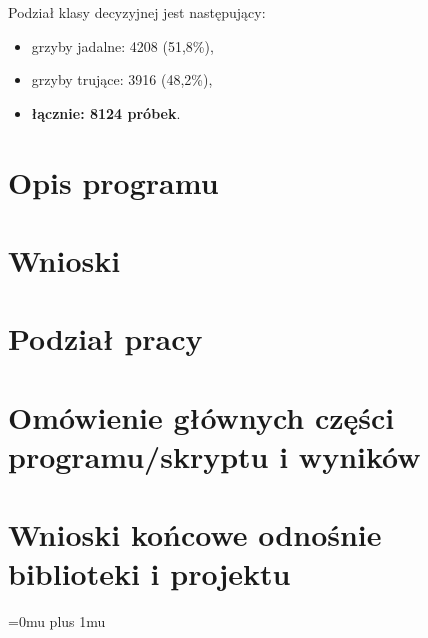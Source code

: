 \documentclass[10pt,a4paper]{article}
\begin{document}
Podział klasy decyzyjnej jest następujący:
\begin{itemize}[label=-]
	\item grzyby jadalne: 4208 (51,8\%),
	\item grzyby trujące: 3916 (48,2\%),
	\item \textbf{łącznie: 8124 próbek}.
\end{itemize}
\section{Opis programu}

\section{Wnioski}

\section{Podział pracy}


\section{Omówienie głównych części programu/skryptu i wyników}

\section{Wnioski końcowe odnośnie biblioteki i projektu}

\Urlmuskip=0mu plus 1mu\relax
{}

\end{document}
